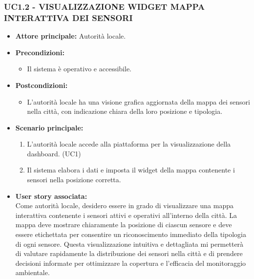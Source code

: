 \subsubsection{UC1.2 - VISUALIZZAZIONE WIDGET MAPPA INTERATTIVA DEI SENSORI}
\begin{itemize}
    \item \textbf{Attore principale:} Autorità locale.
    \item \textbf{Precondizioni:}
        \begin{itemize}
            \item  Il sistema è operativo e accessibile.
        \end{itemize}
    \item \textbf{Postcondizioni:}
        \begin{itemize}
            \item L’autorità locale ha una visione grafica aggiornata della mappa dei sensori nella città, con indicazione chiara della loro posizione e tipologia.
        \end{itemize}
    \item \textbf{Scenario principale:}
        \begin{enumerate}
            \item L'autorità locale accede alla piattaforma per la visualizzazione della dashboard. (UC1)
            \item Il sistema elabora i dati e imposta il widget della mappa contenente i sensori nella posizione corretta.
        \end{enumerate}
    \item \textbf{User story associata:} \\
        Come autorità locale, desidero essere in grado di visualizzare una mappa interattiva contenente i sensori attivi e operativi all’interno della città. La mappa deve mostrare chiaramente la posizione di ciascun sensore e deve essere etichettata per consentire un riconoscimento immediato della tipologia di ogni sensore. Questa visualizzazione intuitiva e dettagliata mi permetterà di valutare rapidamente la distribuzione dei sensori nella città e di prendere decisioni informate per ottimizzare la copertura e l'efficacia del monitoraggio ambientale.
\end{itemize}